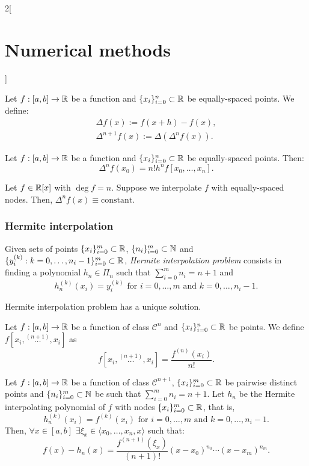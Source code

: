 \documentclass[../../../main.tex]{subfiles}
\begin{document}
\begin{multicols}{2}[\section{Numerical methods}]
\begin{prop}
\end{prop}
\begin{definition}
    Let $f:[a,b]\rightarrow\mathbb{R}$ be a function and $\{x_i\}_{i=0}^n\subset\mathbb{R}$ be equally-spaced points. We define:
    \begin{gather*}
        \Delta f(x):=f(x+h)-f(x),\\
        \Delta^{n+1}f(x):=\Delta(\Delta^nf(x)).
    \end{gather*}
\end{definition}
\begin{lemma}
    Let $f:[a,b]\rightarrow\mathbb{R}$ be a function and $\{x_i\}_{i=0}^n\subset\mathbb{R}$ be equally-spaced points. Then: $$\Delta^nf(x_0)=n!h^nf[x_0,\ldots,x_n].$$
\end{lemma}
\begin{corollary}
    Let $f\in\mathbb{R}[x]$ with $\deg f=n$. Suppose we interpolate $f$ with equally-spaced nodes. Then, $\Delta^nf(x)\equiv\text{constant}$.
\end{corollary}
\subsubsection*{Hermite interpolation}
\begin{definition}
    Given sets of points $\{x_i\}_{i=0}^m\subset\mathbb{R}$, $\{n_i\}_{i=0}^m\subset\mathbb{N}$ and $\{y_i^{(k)}:k=0,\ldots,n_i-1\}_{i=0}^m\subset\mathbb{R}$, \textit{Hermite interpolation problem} consists in finding a polynomial $h_n\in\Pi_n$ such that $\sum_{i=0}^mn_i=n+1$ and $$h_n^{(k)}(x_i)=y_i^{(k)}\text{ for }i=0,\ldots,m\text{ and }k=0,\ldots,n_i-1.$$
\end{definition}
\begin{prop}
    Hermite interpolation problem has a unique solution.
\end{prop}
\begin{definition}
    Let $f:[a,b]\rightarrow\mathbb{R}$ be a function of class $\mathcal{C}^n$ and $\{x_i\}_{i=0}^n\subset\mathbb{R}$ be points. We define $f[x_i,\overset{(n+1)}{\ldots},x_i]$ as $$f[x_i,\overset{(n+1)}{\ldots},x_i]=\frac{f^{(n)}(x_i)}{n!}.$$
\end{definition}
\begin{theorem}
    Let $f:[a,b]\rightarrow\mathbb{R}$ be a function of class $\mathcal{C}^{n+1}$, $\{x_i\}_{i=0}^m\subset\mathbb{R}$ be pairwise distinct points and $\{n_i\}_{i=0}^m\subset\mathbb{N}$ be such that $\sum_{i=0}^mn_i=n+1$. Let $h_n$ be the Hermite interpolating polynomial of $f$ with nodes $\{x_i\}_{i=0}^m\subset\mathbb{R}$, that is, $$h_n^{(k)}(x_i)=f^{(k)}(x_i)\text{ for }i=0,\ldots,m\text{ and }k=0,\ldots,n_i-1.$$ Then, $\forall x\in[a,b]$ $\exists\xi_x\in\langle x_0,\ldots,x_n,x\rangle$ such that: $$f(x)-h_n(x)=\frac{f^{(n+1)}(\xi_x)}{(n+1)!}(x-x_0)^{n_0}\cdots(x-x_m)^{n_m}.$$
\end{theorem}

\end{multicols}
\end{document}
